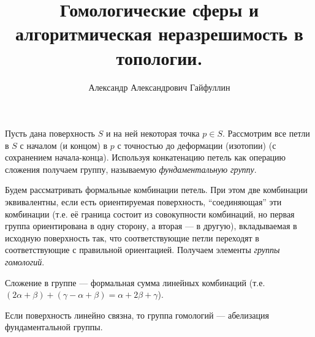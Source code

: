 \documentclass[12pt,a4paper]{article}
\title{Гомологические сферы и алгоритмическая неразрешимость в топологии.}
\author{Александр Александрович Гайфуллин}
\begin{document}
    \maketitle

    \begin{definition}
        Пусть дана поверхность $S$ и на ней некоторая точка $p \in S$. Рассмотрим все петли в $S$ с началом (и концом) в $p$ с точностью до деформации (изотопии) (с сохранением начала-конца). Используя конкатенацию петель как операцию сложения получаем группу, называемую \emph{фундаментальную группу}.
    \end{definition}

    \begin{definition}
        Будем рассматривать формальные комбинации петель. При этом две комбинации эквивалентны, если есть ориентируемая поверхность, ``соединяющая'' эти комбинации (т.е. её граница состоит из совокупности комбинаций, но первая группа ориентирована в одну сторону, а вторая --- в другую), вкладываемая в исходную поверхность так, что соответствующие петли переходят в соответствующие с правильной ориентацией. Получаем элементы \emph{группы гомологий}.

        Сложение в группе --- формальная сумма линейных комбинаций (т.е. $(2\alpha + \beta) + (\gamma - \alpha + \beta) = \alpha + 2\beta + \gamma$).
    \end{definition}

    \begin{theorem}
        Если поверхность линейно связна, то группа гомологий --- абелизация фундаментальной группы.
    \end{theorem}
\end{document}
